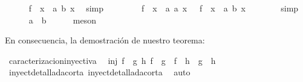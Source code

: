 \begin{isabellebody}
\ \isamarkupfalse%
\ {\isachardoublequoteopen}{\isachardot}{\isachardot}{\isachardot}\ {\isacharequal}\ \ {\isacharparenleft}f\ {\isasymcirc}\ {\isacharparenleft}{\isasymlambda}x\ {\isacharcolon}{\isacharcolon}\ {\isacharprime}a{\isachardot}\ b{\isacharparenright}{\isacharparenright}\ x{\isachardoublequoteclose}\ \isamarkupfalse%
\ simp\isanewline
\ \ \ \ \isamarkupfalse%
\ \isamarkupfalse%
\ {\isachardoublequoteopen}\ {\isacharparenleft}f\ {\isasymcirc}\ {\isacharparenleft}{\isasymlambda}x\ {\isacharcolon}{\isacharcolon}\ {\isacharprime}a{\isachardot}\ a{\isacharparenright}{\isacharparenright}\ x\ {\isacharequal}\ \ {\isacharparenleft}f\ {\isasymcirc}\ {\isacharparenleft}{\isasymlambda}x\ {\isacharcolon}{\isacharcolon}\ {\isacharprime}a{\isachardot}\ b{\isacharparenright}{\isacharparenright}\ x{\isachardoublequoteclose}\isanewline
\ \ \ \ \ \ \isamarkupfalse%
\ simp\isanewline
\ \ \isamarkupfalse%
\isanewline
\ \ \isamarkupfalse%
\ \ {\isachardoublequoteopen}\ a\ {\isacharequal}\ b{\isachardoublequoteclose}\ \isamarkupfalse%
\ {}\ {}\ \isamarkupfalse%
\ meson\isanewline
{}\isamarkupfalse%
%
\endisatagproof
{\isafoldproof}%
%
\isadelimproof
%
\endisadelimproof
%
\begin{isamarkuptext}%
En consecuencia, la demostración de nuestro teorema:%
\end{isamarkuptext}\isamarkuptrue%
\isamarkupfalse%
\ caracterizacioninyectiva{\isacharcolon}\isanewline
\ \ {\isachardoublequoteopen}inj\ f\ {\isasymlongleftrightarrow}\ {\isacharparenleft}{\isasymforall}g\ h{\isachardot}\ {\isacharparenleft}f\ {\isasymcirc}\ g\ {\isacharequal}\ f\ {\isasymcirc}\ h{\isacharparenright}\ {\isasymlongrightarrow}\ {\isacharparenleft}g\ {\isacharequal}\ h{\isacharparenright}{\isacharparenright}{\isachardoublequoteclose}\isanewline
%
\isadelimproof
\ \ %
\endisadelimproof
%
\isatagproof
{}\isamarkupfalse%
\ inyectdetalladacorta{}\ inyectdetalladacorta{}\ \isamarkupfalse%
\ auto\isanewline
\isanewline
\isanewline
\isanewline
\isanewline
%
\endisatagproof
{\isafoldproof}%
%
\isadelimproof
%
\endisadelimproof
%
\isadelimtheory
%
\endisadelimtheory
%
\isatagtheory
%
\endisatagtheory
{\isafoldtheory}%
%
\isadelimtheory
%
\endisadelimtheory
%
\end{isabellebody}%
\endinput
